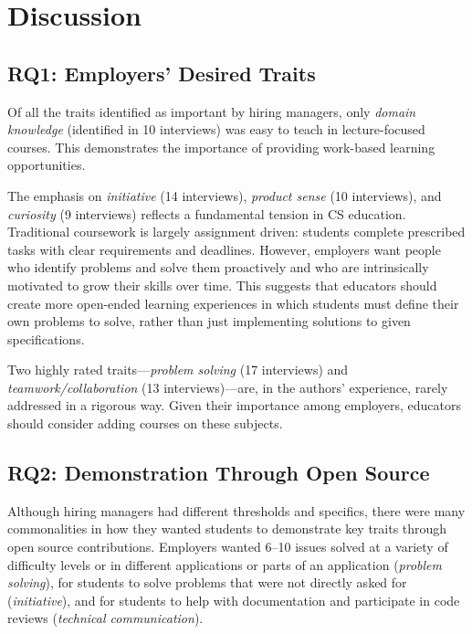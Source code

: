 \section{Discussion}

\subsection{RQ1: Employers' Desired Traits}

Of all the traits identified as important by hiring managers, only \textit{domain knowledge} (identified in 10 interviews) was easy to teach in lecture-focused courses. This demonstrates the importance of providing work-based learning opportunities.

The emphasis on \textit{initiative} (14 interviews), \textit{product sense} (10 interviews), and \textit{curiosity} (9 interviews) reflects a fundamental tension in CS education. Traditional coursework is largely assignment driven: students complete prescribed tasks with clear requirements and deadlines. However, employers want people who identify problems and solve them proactively and who are intrinsically motivated to grow their skills over time. This suggests that educators should create more open-ended learning experiences in which students must define their own problems to solve, rather than just implementing solutions to given specifications.

Two highly rated traits---\textit{problem solving} (17 interviews) and \textit{teamwork/collaboration} (13 interviews)---are, in the authors' experience, rarely addressed in a rigorous way. Given their importance among employers, educators should consider adding courses on these subjects.

\subsection{RQ2: Demonstration Through Open Source}

Although hiring managers had different thresholds and specifics, there were many commonalities in how they wanted students to demonstrate key traits through open source contributions. Employers wanted 6--10 issues solved at a variety of difficulty levels or in different applications or parts of an application (\textit{problem solving}), for students to solve problems that were not directly asked for (\textit{initiative}), and for students to help with documentation and participate in code reviews (\textit{technical communication}).

